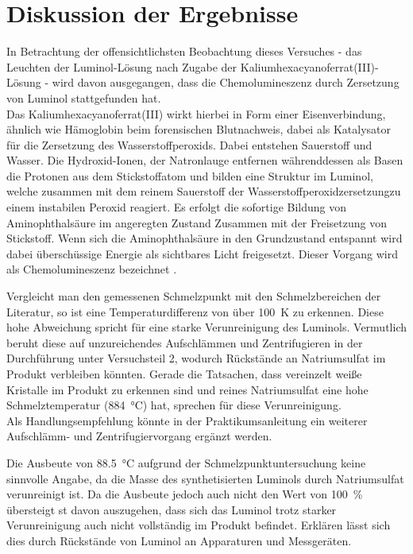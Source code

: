 \section{Diskussion der Ergebnisse}
\label{sec:diskussion}

In Betrachtung der offensichtlichsten Beobachtung dieses Versuches - das Leuchten der Luminol-Lösung nach Zugabe der Kaliumhexacyanoferrat(III)-Lösung - wird davon ausgegangen, dass die Chemolumineszenz durch Zersetzung von Luminol stattgefunden hat. \\
Das Kaliumhexacyanoferrat(III) wirkt hierbei in Form einer Eisenverbindung, ähnlich wie Hämoglobin beim forensischen Blutnachweis, dabei als Katalysator für die Zersetzung des Wasserstoffperoxids. Dabei entstehen Sauerstoff und Wasser. Die Hydroxid-Ionen, der Natronlauge entfernen währenddessen als Basen die Protonen aus dem Stickstoffatom und bilden eine Struktur im Luminol, welche zusammen mit dem reinem Sauerstoff der Wasserstoffperoxidzersetzungzu einem instabilen Peroxid reagiert. Es erfolgt die sofortige Bildung von Aminophthalsäure im angeregten Zustand Zusammen mit der Freisetzung von Stickstoff. Wenn sich die Aminophthalsäure in den Grundzustand entspannt wird dabei überschüssige Energie als sichtbares Licht freigesetzt. Dieser Vorgang wird als Chemolumineszenz bezeichnet \cite{Sabnis.2009}.

Vergleicht man den gemessenen Schmelzpunkt mit den Schmelzbereichen der Literatur, so ist eine Temperaturdifferenz von über \SI{100}{K} zu erkennen. Diese hohe Abweichung spricht für eine starke Verunreinigung des Luminols. Vermutlich beruht diese auf unzureichendes Aufschlämmen und Zentrifugieren in der Durchführung unter Versuchsteil 2, wodurch Rückstände an Natriumsulfat im Produkt verbleiben könnten. Gerade die Tatsachen, dass vereinzelt weiße Kristalle im Produkt zu erkennen sind und reines Natriumsulfat eine hohe Schmelztemperatur (\SI{884}{\celsius}) hat, sprechen für diese Verunreinigung. \cite{Sitzmann.2009}\\ 
Als Handlungsempfehlung könnte in der Praktikumsanleitung ein weiterer Aufschlämm- und Zentrifugiervorgang ergänzt werden.

Die Ausbeute von \SI{88,5}{\celsius} aufgrund der Schmelzpunktuntersuchung keine sinnvolle Angabe, da die Masse des synthetisierten Luminols durch Natriumsulfat verunreinigt ist. Da die Ausbeute jedoch auch nicht den Wert von \SI{100}{\percent} übersteigt st davon auszugehen, dass sich das Luminol trotz starker Verunreinigung auch nicht vollständig im Produkt befindet. Erklären lässt sich dies durch Rückstände von Luminol an Apparaturen und Messgeräten.